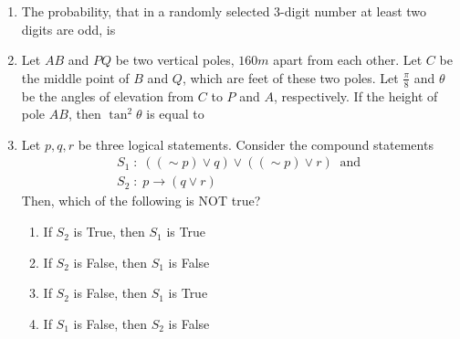 \documentclass[journal,,12pt,onecolumn]{IEEEtran}
\theoremstyle{remark}
\begin{document}
\begin{enumerate}
\begin{enumerate}
        \end{enumerate}
        \bigskip
\item The probability, that in a randomly selected 3-digit number at least two digits are odd, is
        \begin{enumerate}
        \end{enumerate}
        \bigskip
    \item Let $AB$ and $PQ$ be two vertical poles, $160m$ apart from each other. Let $C$ be the middle point of $B$ and $Q$, which are feet of these two poles. Let $\frac{\pi}{8}$ and $\theta$ be the angles of elevation from $C$ to $P$ and $A$, respectively. If the height of pole $AB$, then $\tan^2{\theta}$ is equal to
    \begin{enumerate}
        \end{enumerate}
\bigskip
\item Let $p,q,r$ be three logical statements. Consider the compound statements
\begin{align*}
S_1 \;:\; ((\sim p) \lor q) \lor ((\sim p) \lor r) \ \text{ and } \\
S_2 \;:\; p \rightarrow (q \lor r)
\end{align*}
 Then, which of the following is NOT true?
 \begin{enumerate}
 \item If $S_2$ is True, then $S_1$ is True
 \item If $S_2$ is False, then $S_1$ is False
 \item If $S_2$ is False, then $S_1$ is True
\item If $S_1$ is False, then $S_2$ is False
 \end{enumerate}
 \end{enumerate}

 
\end{document}
